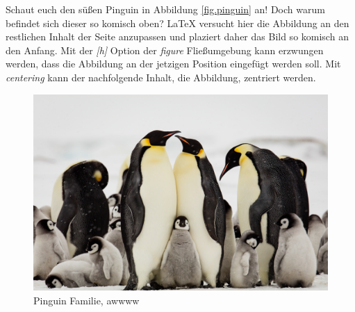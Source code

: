 Schaut euch den süßen Pinguin in Abbildung \ref{fig.pinguin} an! Doch warum befindet sich dieser so komisch oben? LaTeX versucht hier die Abbildung an den restlichen Inhalt der Seite anzupassen und plaziert daher das Bild so komisch an den Anfang. Mit der \textit{[h]} Option der \textit{figure} Fließumgebung kann erzwungen werden, dass die Abbildung an der jetzigen Position eingefügt werden soll. Mit \textit{centering} kann der nachfolgende Inhalt, die Abbildung, zentriert werden.

\begin{figure}[h]
    \centering
    \includegraphics[scale=0.2]{penguin-family.jpg}
    \caption{Pinguin Familie, awwww}
    \label{fig.pinguinFamily}
\end{figure}

\newpage